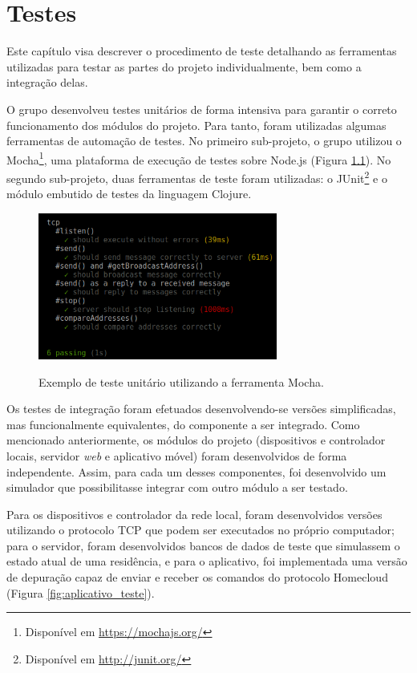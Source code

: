 \chapter{Testes}\label{chp:testes}
Este capítulo visa descrever o procedimento de teste detalhando as ferramentas utilizadas para testar as partes do projeto individualmente, bem como a integração delas.

O grupo desenvolveu testes unitários de forma intensiva para garantir o correto funcionamento dos módulos do projeto. Para tanto, foram utilizadas algumas ferramentas de automação de testes. No primeiro sub-projeto, o grupo utilizou o Mocha\footnote{Disponível em \url{https://mochajs.org/}}, uma plataforma de execução de testes sobre Node.js (Figura \ref{fig:mocha_teste}). No segundo sub-projeto, duas ferramentas de teste foram utilizadas: o JUnit\footnote{Disponível em \url{http://junit.org/}} e o módulo embutido de testes da linguagem Clojure.

\begin{figure}[h]
	\centering
	\caption{Exemplo de teste unitário utilizando a ferramenta Mocha.}
  \includegraphics[width=0.7\textwidth]{imagens/mocha_teste.png}
  \label{fig:mocha_teste}  
\end{figure}

Os testes de integração foram efetuados desenvolvendo-se versões simplificadas, mas funcionalmente equivalentes, do componente a ser integrado. Como mencionado anteriormente, os módulos do projeto (dispositivos e controlador locais, servidor \textit{web} e aplicativo móvel) foram desenvolvidos de forma independente. Assim, para cada um desses componentes, foi desenvolvido um simulador que possibilitasse integrar com outro módulo a ser testado.

Para os dispositivos e controlador da rede local, foram desenvolvidos versões utilizando o protocolo TCP que podem ser executados no próprio computador; para o servidor, foram desenvolvidos bancos de dados de teste que simulassem o estado atual de uma residência, e para o aplicativo, foi implementada uma versão de depuração capaz de enviar e receber os comandos do protocolo Homecloud (Figura \ref{fig:aplicativo_teste}).

